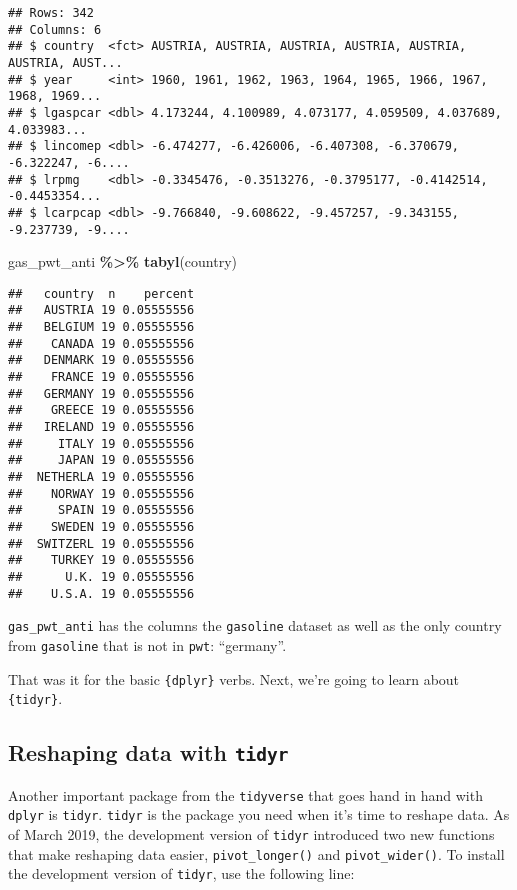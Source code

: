 \documentclass[
]{article}
\newenvironment{Shaded}{\begin{snugshade}}{\end{snugshade}}
\newcommand{\KeywordTok}[1]{\textcolor[rgb]{0.13,0.29,0.53}{\textbf{#1}}}
\newcommand{\NormalTok}[1]{#1}
\newcommand{\OperatorTok}[1]{\textcolor[rgb]{0.81,0.36,0.00}{\textbf{#1}}}
\newcommand{\StringTok}[1]{\textcolor[rgb]{0.31,0.60,0.02}{#1}}
\begin{document}
\begin{verbatim}
## Rows: 342
## Columns: 6
## $ country  <fct> AUSTRIA, AUSTRIA, AUSTRIA, AUSTRIA, AUSTRIA, AUSTRIA, AUST...
## $ year     <int> 1960, 1961, 1962, 1963, 1964, 1965, 1966, 1967, 1968, 1969...
## $ lgaspcar <dbl> 4.173244, 4.100989, 4.073177, 4.059509, 4.037689, 4.033983...
## $ lincomep <dbl> -6.474277, -6.426006, -6.407308, -6.370679, -6.322247, -6....
## $ lrpmg    <dbl> -0.3345476, -0.3513276, -0.3795177, -0.4142514, -0.4453354...
## $ lcarpcap <dbl> -9.766840, -9.608622, -9.457257, -9.343155, -9.237739, -9....
\end{verbatim}

\begin{Shaded}
\begin{Highlighting}[]
\NormalTok{gas\_pwt\_anti }\OperatorTok{\%\textgreater{}\%}
\StringTok{  }\KeywordTok{tabyl}\NormalTok{(country)}
\end{Highlighting}
\end{Shaded}

\begin{verbatim}
##   country  n    percent
##   AUSTRIA 19 0.05555556
##   BELGIUM 19 0.05555556
##    CANADA 19 0.05555556
##   DENMARK 19 0.05555556
##    FRANCE 19 0.05555556
##   GERMANY 19 0.05555556
##    GREECE 19 0.05555556
##   IRELAND 19 0.05555556
##     ITALY 19 0.05555556
##     JAPAN 19 0.05555556
##  NETHERLA 19 0.05555556
##    NORWAY 19 0.05555556
##     SPAIN 19 0.05555556
##    SWEDEN 19 0.05555556
##  SWITZERL 19 0.05555556
##    TURKEY 19 0.05555556
##      U.K. 19 0.05555556
##    U.S.A. 19 0.05555556
\end{verbatim}

\texttt{gas\_pwt\_anti} has the columns the \texttt{gasoline} dataset as well as the only country from \texttt{gasoline}
that is not in \texttt{pwt}: ``germany''.

That was it for the basic \texttt{\{dplyr\}} verbs. Next, we're going to learn about \texttt{\{tidyr\}}.

\hypertarget{reshaping-data-with-tidyr}{%
\subsection{\texorpdfstring{Reshaping data with \texttt{tidyr}}{Reshaping data with tidyr}}\label{reshaping-data-with-tidyr}}

Another important package from the \texttt{tidyverse} that goes hand in hand with \texttt{dplyr} is \texttt{tidyr}. \texttt{tidyr}
is the package you need when it's time to reshape data. As of March 2019, the development version
of \texttt{tidyr} introduced two new functions that make reshaping data easier, \texttt{pivot\_longer()} and \texttt{pivot\_wider()}.
To install the development version of \texttt{tidyr}, use the following line:
\end{document}
